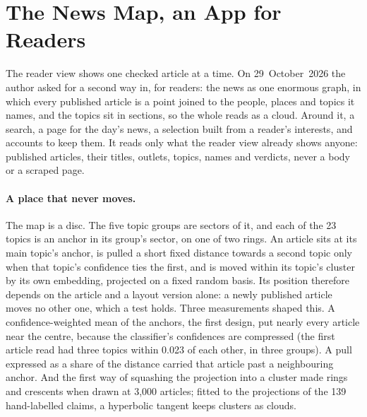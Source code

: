 
\section{The News Map, an App for Readers}
\label{sec:dev-news-map}

The reader view shows one checked article at a time. On 29~October~2026
the author asked for a second way in, for readers: the news as one
enormous graph, in which every published article is a point joined to
the people, places and topics it names, and the topics sit in sections,
so the whole reads as a cloud. Around it, a search, a page for the
day's news, a selection built from a reader's interests, and accounts
to keep them. It reads only what the reader view already shows anyone:
published articles, their titles, outlets, topics, names and verdicts,
never a body or a scraped page.

\paragraph{A place that never moves.} The map is a disc. The five topic
groups are sectors of it, and each of the 23 topics is an anchor in its
group's sector, on one of two rings. An article sits at its main
topic's anchor, is pulled a short fixed distance towards a second topic
only when that topic's confidence ties the first, and is moved within
its topic's cluster by its own embedding, projected on a fixed random
basis. Its position therefore depends on the article and a layout
version alone: a newly published article moves no other one, which a
test holds. Three measurements shaped this. A confidence-weighted mean
of the anchors, the first design, put nearly every article near the
centre, because the classifier's confidences are compressed (the first
article read had three topics within 0.023 of each other, in three
groups). A pull expressed as a share of the distance carried that
article past a neighbouring anchor. And the first way of squashing the
projection into a cluster made rings and crescents when drawn at 3,000
articles; fitted to the projections of the 139 hand-labelled claims, a
hyperbolic tangent keeps clusters as clouds.

